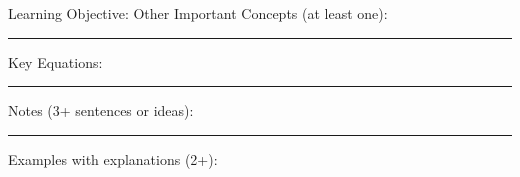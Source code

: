 \documentclass{article}
\theoremstyle{plain}
\theoremstyle{definition}
\theoremstyle{remark}
\begin{document}
\newpage
\noindent \large Learning Objective:
\normalsize
\vskip0.1in
\noindent Other Important Concepts (at least one):\\
\vspace{0.75in}
\hrule
\vspace{0.1in}
\large \noindent Key Equations:
\normalsize

\vspace{1.25in}
\hrule
\vspace{0.1in}
\large \noindent Notes (3+ sentences or ideas):
\normalsize
\vspace{1.75in}
\hrule
\vspace{0.1in}

\large \noindent Examples with explanations (2+):
\end{document}
